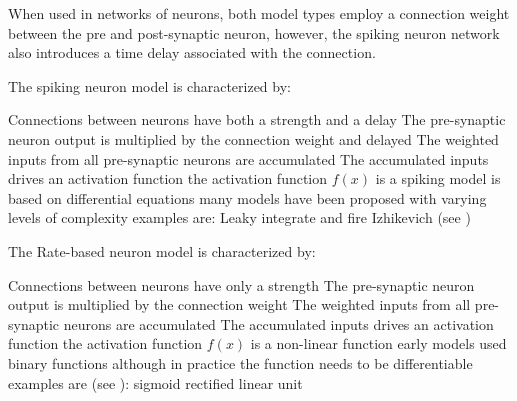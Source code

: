 When used in networks of neurons, both model types employ a connection weight between the pre and post-synaptic neuron, however, the spiking neuron network also introduces a time delay associated with the connection.

The spiking neuron model is characterized by:

\begin{outline}
        \1 Connections between neurons have both a strength and a delay
          \2 The pre-synaptic neuron output is multiplied by the connection weight and delayed
        \1 The weighted inputs from all pre-synaptic neurons are accumulated
        \1 The accumulated inputs drives an activation function
          \2 the activation function $f(x)$ is a spiking model is based on differential equations
          \2 many models have been proposed with varying levels of complexity
            \3 examples are:
              \4 Leaky integrate and fire
              \4 Izhikevich \cite{Iz2005} (see )
         
\end{outline}

The Rate-based neuron model is characterized by:
\begin{outline}
        \1 Connections between neurons have only a strength
          \2 The pre-synaptic neuron output is multiplied by the connection weight
        \1 The weighted inputs from all pre-synaptic neurons are accumulated
        \1 The accumulated inputs drives an activation function
          \2 the activation function $f(x)$ is a non-linear function
          \2 early models used binary functions although in practice the function needs to be differentiable
            \3 examples are (see ):
              \4 sigmoid
              \4 rectified linear unit
\end{outline}

